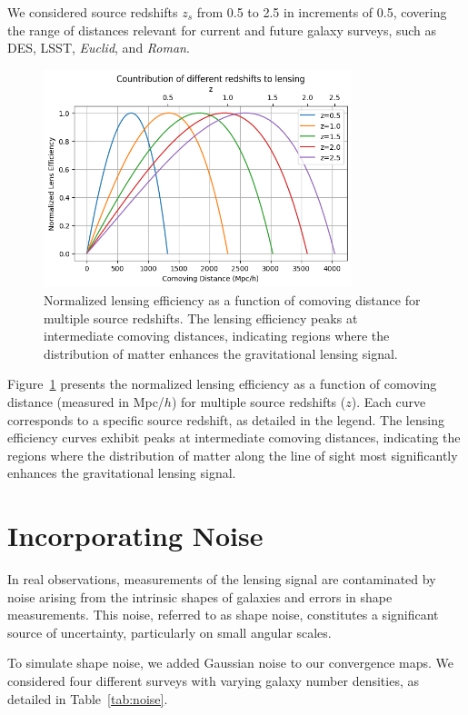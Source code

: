 We considered source redshifts $z_s$ from 0.5 to 2.5 in increments of 0.5, covering the range of distances relevant for current and future galaxy surveys, such as DES, LSST, \textit{Euclid}, and \textit{Roman}.

\begin{figure}
    \centering
    \includegraphics[width=0.8\textwidth]{figures/lensefficiency.png}
    \caption{Normalized lensing efficiency as a function of comoving distance for multiple source redshifts. The lensing efficiency peaks at intermediate comoving distances, indicating regions where the distribution of matter enhances the gravitational lensing signal.} \label{fig:lensing_efficiency}
\end{figure}
Figure~\ref{fig:lensing_efficiency} presents the normalized lensing efficiency as a function of comoving distance (measured in Mpc/$h$) for multiple source redshifts ($z$). Each curve corresponds to a specific source redshift, as detailed in the legend. The lensing efficiency curves exhibit peaks at intermediate comoving distances, indicating the regions where the distribution of matter along the line of sight most significantly enhances the gravitational lensing signal. 

\section{Incorporating Noise}
In real observations, measurements of the lensing signal are contaminated by noise arising from the intrinsic shapes of galaxies and errors in shape measurements. This noise, referred to as shape noise, constitutes a significant source of uncertainty, particularly on small angular scales.

To simulate shape noise, we added Gaussian noise to our convergence maps. We considered four different surveys with varying galaxy number densities, as detailed in Table~\ref{tab:noise}.

